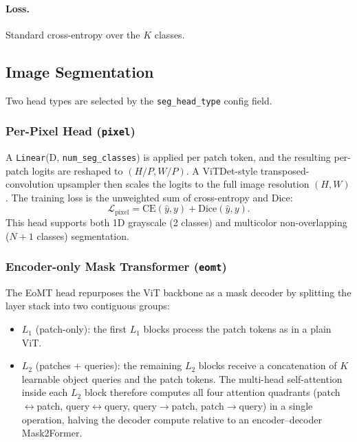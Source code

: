 \paragraph{Loss.}
Standard cross-entropy over the $K$ classes.

\subsection{Image Segmentation}

Two head types are selected by the \texttt{seg\_head\_type} config field.

\subsubsection{Per-Pixel Head (\texttt{pixel})}
A \texttt{Linear}(D, \texttt{num\_seg\_classes}) is applied per patch token, and the resulting per-patch logits are reshaped to $(H/P, W/P)$. A ViTDet-style transposed-convolution upsampler then scales the logits to the full image resolution $(H, W)$. The training loss is the unweighted sum of cross-entropy and Dice:
\[
\mathcal{L}_\text{pixel} = \mathrm{CE}(\hat{y}, y) + \mathrm{Dice}(\hat{y}, y).
\]
This head supports both 1D grayscale (2 classes) and multicolor non-overlapping ($N+1$ classes) segmentation.

\subsubsection{Encoder-only Mask Transformer (\texttt{eomt})}

The EoMT head \citep{kerssies2025eomt} repurposes the ViT backbone as a mask decoder by splitting the layer stack into two contiguous groups:

\begin{itemize}[leftmargin=*]
    \item \textbf{$L_1$} (patch-only): the first $L_1$ blocks process the patch tokens as in a plain ViT.
    \item \textbf{$L_2$} (patches + queries): the remaining $L_2$ blocks receive a concatenation of $K$ learnable object queries and the patch tokens. The multi-head self-attention inside each $L_2$ block therefore computes all four attention quadrants (patch$\leftrightarrow$patch, query$\leftrightarrow$query, query$\to$patch, patch$\to$query) in a single operation, halving the decoder compute relative to an encoder--decoder Mask2Former.
\end{itemize}

